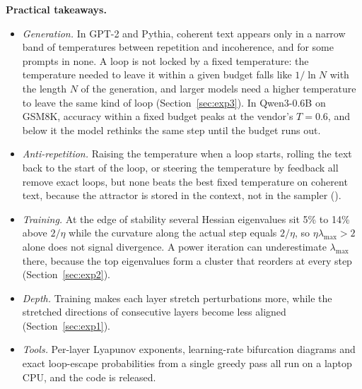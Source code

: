 \begin{tcolorbox}[breakable, enhanced jigsaw, colback=white, colframe=black, boxrule=0.5pt, arc=0pt, left=5pt, right=5pt, top=3pt, bottom=3pt]
\textbf{Practical takeaways.}
\begin{itemize}[leftmargin=*,itemsep=1pt,topsep=2pt]
\item \emph{Generation.} In GPT-2 and Pythia, coherent text appears only in a narrow band of temperatures between repetition and incoherence, and for some prompts in none. A loop is not locked by a fixed temperature: the temperature needed to leave it within a given budget falls like $1/\ln N$ with the length $N$ of the generation, and larger models need a higher temperature to leave the same kind of loop (Section~\ref{sec:exp3}). In Qwen3-0.6B on GSM8K, accuracy within a fixed budget peaks at the vendor's $T=0.6$, and below it the model rethinks the same step until the budget runs out.
\item \emph{Anti-repetition.} Raising the temperature when a loop starts, rolling the text back to the start of the loop, or steering the temperature by feedback all remove exact loops, but none beats the best fixed temperature on coherent text, because the attractor is stored in the context, not in the sampler ().
\item \emph{Training.} At the edge of stability several Hessian eigenvalues sit 5\% to 14\% above $2/\eta$ while the curvature along the actual step equals $2/\eta$, so $\eta\lambda_{\max}>2$ alone does not signal divergence. A power iteration can underestimate $\lambda_{\max}$ there, because the top eigenvalues form a cluster that reorders at every step (Section~\ref{sec:exp2}).
\item \emph{Depth.} Training makes each layer stretch perturbations more, while the stretched directions of consecutive layers become less aligned (Section~\ref{sec:exp1}).
\item \emph{Tools.} Per-layer Lyapunov exponents, learning-rate bifurcation diagrams and exact loop-escape probabilities from a single greedy pass all run on a laptop CPU, and the code is released.
\end{itemize}
\end{tcolorbox}
